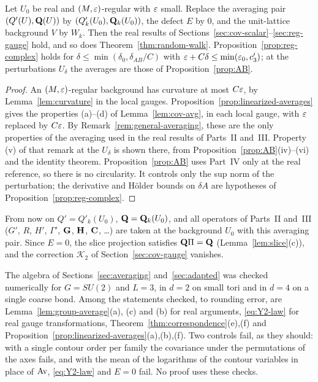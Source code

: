 \begin{corollary}\label{cor:parts-apply}
Let $U_0$ be real and $(M,\varepsilon)$-regular with $\varepsilon$ small. Replace the averaging pair $(Q'(U),\mathbf Q(U))$ by $(Q'_k(U_0),\mathbf Q_k(U_0))$, the defect $E$ by $0$, and the unit-lattice background $V$ by $W_k$. Then the real results of Sections~\ref{sec:cov-scalar}--\ref{sec:reg-gauge} hold, and so does Theorem~\ref{thm:random-walk}. Proposition~\ref{prop:reg-complex} holds for $\delta\le\min(\delta_0,\delta_{AB}/C)$ with $\varepsilon+C\delta\le\min(\varepsilon_0,c'_3)$; at the perturbations $U_\delta$ the averages are those of Proposition~\ref{prop:AB}.
\end{corollary}

\begin{proof}
An $(M,\varepsilon)$-regular background has curvature at most $C\varepsilon$, by Lemma~\ref{lem:curvature} in the local gauges. Proposition~\ref{prop:linearized-averages} gives the properties (a)--(d) of Lemma~\ref{lem:cov-avg}, in each local gauge, with $\varepsilon$ replaced by $C\varepsilon$. By Remark~\ref{rem:general-averaging}, these are the only properties of the averaging used in the real results of Parts~II and~III. Property (v) of that remark at the $U_\delta$ is shown there, from Proposition~\ref{prop:AB}(iv)--(vi) and the identity theorem. Proposition~\ref{prop:AB} uses Part~IV only at the real reference, so there is no circularity. It controls only the sup norm of the perturbation; the derivative and H\"older bounds on $\delta\!A$ are hypotheses of Proposition~\ref{prop:reg-complex}.
\end{proof}

From now on $Q'=Q'_k(U_0)$, $\mathbf Q=\mathbf Q_k(U_0)$, and all operators of Parts~II and~III ($G'$, $R$, $H'$, $\Gamma'$, $\mathbf G$, $\mathbf H$, $\mathbf C$, \dots) are taken at the background $U_0$ with this averaging pair. Since $E=0$, the slice projection satisfies $\mathbf Q\Pi=\mathbf Q$ (Lemma~\ref{lem:slice}(c)), and the correction $\mathcal K_2$ of Section~\ref{sec:cov-gauge} vanishes.

\begin{remark}\label{rem:avg-numerical}
The algebra of Sections~\ref{sec:averaging} and~\ref{sec:adapted} was checked numerically for $G=SU(2)$ and $L=3$, in $d=2$ on small tori and in $d=4$ on a single coarse bond. Among the statements checked, to rounding error, are Lemma~\ref{lem:group-average}(a), (c) and (b) for real arguments, \eqref{eq:Y2-law} for real gauge transformations, Theorem~\ref{thm:correspondence}(e),(f) and Proposition~\ref{prop:linearized-averages}(a),(b),(f). Two controls fail, as they should: with a single contour order per family the covariance under the permutations of the axes fails, and with the mean of the logarithms of the contour variables in place of $\operatorname{Av}$, \eqref{eq:Y2-law} and $E=0$ fail. No proof uses these checks.
\end{remark}
